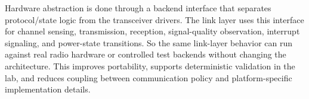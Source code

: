 Hardware abstraction is done through a backend interface that separates protocol/state logic from the
transceiver drivers. The link layer uses this interface for channel sensing, transmission, reception,
signal-quality observation, interrupt signaling, and power-state transitions. So the same
link-layer behavior can run against real radio hardware or controlled test backends without changing the
architecture. This improves portability, supports deterministic validation in the lab, and reduces coupling
between communication policy and platform-specific implementation details.

